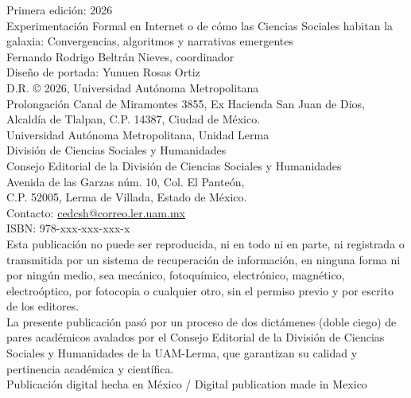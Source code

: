 \begingroup
\begin{singlespace}
\scriptsize
\noindent
Primera edición: 2026\\
Experimentación Formal en Internet o de cómo las Ciencias Sociales habitan la galaxia: Convergencias, algoritmos y narrativas emergentes\\
Fernando Rodrigo Beltrán Nieves, coordinador\\[0.5em]
Diseño de portada: Yunuen Rosas Ortiz\\[0.5em]
D.R. © 2026, Universidad Autónoma Metropolitana\\
Prolongación Canal de Miramontes 3855, Ex Hacienda San Juan de Dios,\\
Alcaldía de Tlalpan, C.P. 14387, Ciudad de México.\\[0.5em]
{\scriptsize Universidad Autónoma Metropolitana, Unidad Lerma}\\
División de Ciencias Sociales y Humanidades\\
Consejo Editorial de la División de Ciencias Sociales y Humanidades\\
Avenida de las Garzas núm. 10, Col. El Panteón,\\
C.P. 52005, Lerma de Villada, Estado de México.\\
Contacto: \href{mailto:cedcsh@correo.ler.uam.mx}{cedcsh@correo.ler.uam.mx}\\[0.8em]
ISBN: 978-xxx-xxx-xxx-x\\[0.8em]
Esta publicación no puede ser reproducida, ni en todo ni en parte, ni registrada o transmitida por un sistema de recuperación de información, en ninguna forma ni por ningún medio, sea mecánico, fotoquímico, electrónico, magnético, electroóptico, por fotocopia o cualquier otro, sin el permiso previo y por escrito de los editores.\\[0.5em]
La presente publicación pasó por un proceso de dos dictámenes (doble ciego) de pares académicos avalados por el Consejo Editorial de la División de Ciencias Sociales y Humanidades de la UAM-Lerma, que garantizan su calidad y pertinencia académica y científica.\\[0.5em]
Publicación digital hecha en México / Digital publication made in Mexico
\end{singlespace}
\endgroup
\clearpage

\clearpage
\thispagestyle{empty}
\null
\clearpage